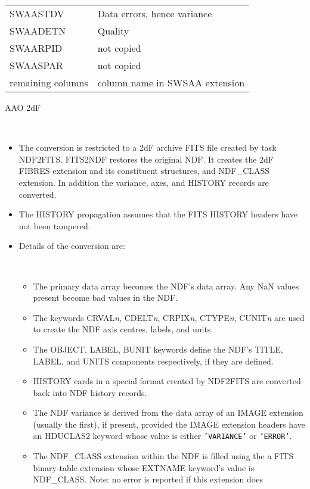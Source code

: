 \documentclass[twoside,11pt]{article}
\newcommand{\htmladdnormallink}[2]{#1}
\newcommand{\latex}[1]{#1}
\newcommand{\xref}[3]{#1}
\newcommand{\ssthitemlist}[1]{
  \latex{
  \mbox{} \\
  \vspace{-3.5ex}
  }
  \begin{itemize}
     #1
  \end{itemize}
}
\newcommand{\sstitem}{\item}
\newcommand{\sstitem}{\item}
\begin{document}
{{{{\begin{tabular}{ll}
               SWAASTDV           &   Data errors, hence variance \\
               SWAADETN           &   Quality \\
               SWAARPID           &   not copied \\
               SWAASPAR           &   not copied \\
               remaining columns  &   column name in SWSAA extension \\
            \end{tabular}
         }
         \bigskip
         \sstitem
         AAO \htmladdnormallink{2dF}{http://www.aao.gov.au/local/www/2df/}
         \ssthitemlist{
            \sstitem
            The conversion is restricted to a 2dF archive FITS file
            created by task NDF2FITS.  FITS2NDF restores the original NDF.
            It creates the 2dF FIBRES extension and its constituent
            structures, and NDF\_CLASS extension.  In addition the variance,
            axes, and HISTORY records are converted.
            \sstitem
            The HISTORY propagation assumes that the FITS HISTORY headers
            have not been tampered.
            \sstitem
            Details of the conversion are:
            \ssthitemlist{
               \sstitem
               The primary data array becomes the NDF's data array.  Any
               NaN values present become \xref{bad}{sun95}{se_badmasking} values in the NDF.
               \sstitem
               The keywords CRVAL\textit{n}, CDELT\textit{n}, CRPIX\textit{n},
               CTYPE\textit{n}, CUNIT\textit{n} are
               used to create the NDF axis centres, labels, and units.
               \sstitem
               The OBJECT, LABEL, BUNIT keywords define the NDF's TITLE,
               LABEL, and UNITS components respectively, if they are defined.
               \sstitem
               HISTORY cards in a special format created by NDF2FITS are
               converted back into NDF history records.
               \sstitem
               The NDF variance is derived from the data array of an
               IMAGE extension (usually the first), if present, provided the
               IMAGE extension headers have an HDUCLAS2 keyword whose value
               is either \texttt{'VARIANCE'} or \texttt{'ERROR'}.
               \sstitem
               The NDF\_CLASS extension within the NDF is filled using the
               a FITS binary-table extension whose EXTNAME keyword's value is
               NDF\_CLASS.  Note: no error is reported if this extension does
}}}}}
\end{document}
